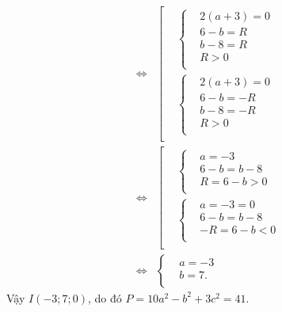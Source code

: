 \begin{ex}
{\begin{eqnarray*}
		&\Leftrightarrow& \left[ \begin{aligned}
			& \left\{ \begin{aligned}
				& 2\left( a+3 \right)=0 \\
				& 6-b=R \\
				& b-8=R \\
				& R>0 \\
			\end{aligned} \right. \\
			& \left\{ \begin{aligned}
				& 2\left( a+3 \right)=0 \\
				& 6-b=-R \\
				& b-8=-R \\
				& R>0 \\
			\end{aligned} \right. \\
		\end{aligned} \right.\\
		&\Leftrightarrow& \left[ \begin{aligned}
			& \left\{ \begin{aligned}
				& a=-3 \\
				& 6-b=b-8 \\
				& R=6-b>0 \\
			\end{aligned} \right. \\
			& \left\{ \begin{aligned}
				& a=-3=0 \\
				& 6-b=b-8 \\
				& -R=6-b<0 \\
			\end{aligned} \right. \\
		\end{aligned} \right.\\
		&\Leftrightarrow&\left\{ \begin{aligned}
			& a=-3 \\
			& b=7. \\
		\end{aligned} \right.
	\end{eqnarray*}
	Vậy $I\left( -3;7;0 \right)$, do đó $P=10a^2-b^2+3c^2=41$.}
\end{ex}
